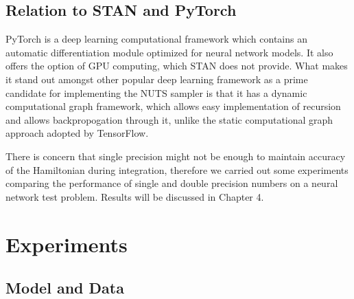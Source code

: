 \documentclass[12pt]{report}
\begin{document}
\section{Relation to STAN and PyTorch}

PyTorch \cite{paszke2017automatic} is a deep learning computational framework which contains an automatic differentiation module optimized for neural network models. It also offers the option of GPU computing, which STAN does not provide. What makes it stand out amongst other popular deep learning framework as a prime candidate for implementing the NUTS sampler is that it has a dynamic computational graph framework, which allows easy implementation of recursion and allows backpropogation through it, unlike the static computational graph approach adopted by TensorFlow.

There is concern that single precision might not be enough to maintain accuracy of the Hamiltonian during integration, therefore we carried out some experiments comparing the performance of single and double precision numbers on a neural network test problem. Results will be discussed in Chapter 4.


\chapter{Experiments}
\section{Model and Data}
\end{document}
